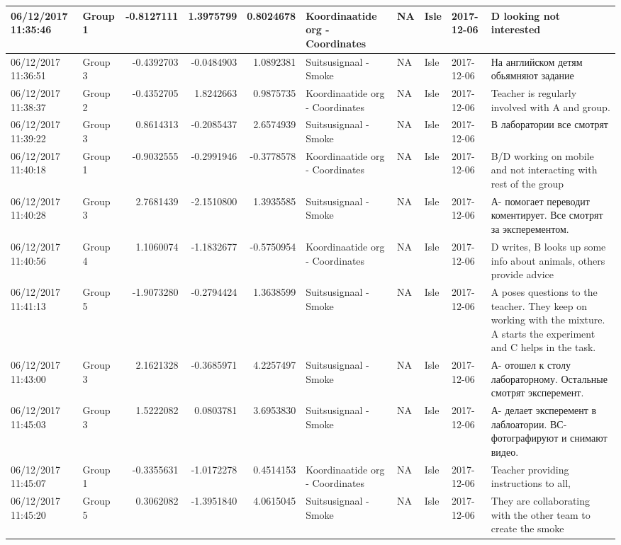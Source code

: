 \documentclass[]{article}
\begin{document}
\begin{tabular}{l|l|r|r|r|l|l|l|l|l}
06/12/2017 11:35:46 & Group 1 & -0.8127111 & 1.3975799 & 0.8024678 & Koordinaatide org - Coordinates & NA & Isle & 2017-12-06 & D looking not interested\\
\hline
06/12/2017 11:36:51 & Group 3 & -0.4392703 & -0.0484903 & 1.0892381 & Suitsusignaal - Smoke & NA & Isle & 2017-12-06 & На английском детям обьямняют задание\\
\hline
06/12/2017 11:38:37 & Group 2 & -0.4352705 & 1.8242663 & 0.9875735 & Koordinaatide org - Coordinates & NA & Isle & 2017-12-06 & Teacher is regularly involved with A and group.\\
\hline
06/12/2017 11:39:22 & Group 3 & 0.8614313 & -0.2085437 & 2.6574939 & Suitsusignaal - Smoke & NA & Isle & 2017-12-06 & В лаборатории все смотрят\\
\hline
06/12/2017 11:40:18 & Group 1 & -0.9032555 & -0.2991946 & -0.3778578 & Koordinaatide org - Coordinates & NA & Isle & 2017-12-06 & B/D working on mobile and not interacting with rest of the group\\
\hline
06/12/2017 11:40:28 & Group 3 & 2.7681439 & -2.1510800 & 1.3935585 & Suitsusignaal - Smoke & NA & Isle & 2017-12-06 & А-  помогает переводит коментирует. Все смотрят за эксперементом.\\
\hline
06/12/2017 11:40:56 & Group 4 & 1.1060074 & -1.1832677 & -0.5750954 & Koordinaatide org - Coordinates & NA & Isle & 2017-12-06 & D writes, B looks up some info about animals, others provide advice\\
\hline
06/12/2017 11:41:13 & Group 5 & -1.9073280 & -0.2794424 & 1.3638599 & Suitsusignaal - Smoke & NA & Isle & 2017-12-06 & A poses questions to the teacher. They keep on working with the mixture. A starts the experiment and C helps in the task.\\
\hline
06/12/2017 11:43:00 & Group 3 & 2.1621328 & -0.3685971 & 4.2257497 & Suitsusignaal - Smoke & NA & Isle & 2017-12-06 & А- отошел к столу лабораторному. Остальные смотрят эксперемент.\\
\hline
06/12/2017 11:45:03 & Group 3 & 1.5222082 & 0.0803781 & 3.6953830 & Suitsusignaal - Smoke & NA & Isle & 2017-12-06 & А- делает эксперемент в лаблоатории. ВС- фотографируют  и снимают видео.\\
\hline
06/12/2017 11:45:07 & Group 1 & -0.3355631 & -1.0172278 & 0.4514153 & Koordinaatide org - Coordinates & NA & Isle & 2017-12-06 & Teacher providing instructions to all,\\
\hline
06/12/2017 11:45:20 & Group 5 & 0.3062082 & -1.3951840 & 4.0615045 & Suitsusignaal - Smoke & NA & Isle & 2017-12-06 & They are collaborating with the other team to create the smoke\\

\end{tabular}
\end{document}
